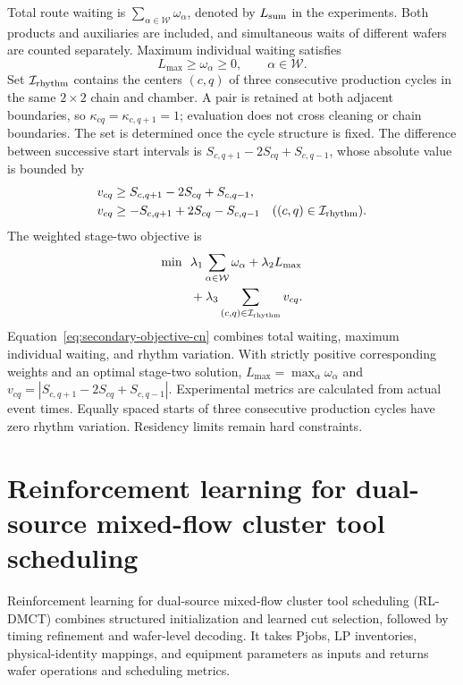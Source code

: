 \documentclass[final,5p,times,twocolumn]{elsarticle}
\newcounter{algorithm}
\begin{document}
Total route waiting is $\sum_{\alpha\in\mathcal W}\omega_\alpha$, denoted by $L_{\rm sum}$ in the experiments. Both products and auxiliaries are included, and simultaneous waits of different wafers are counted separately. Maximum individual waiting satisfies
\begin{equation}
L_{\max}\ge\omega_\alpha\ge0,\qquad \alpha\in\mathcal W.
\label{eq:secondary-wait-cn}
\end{equation}
Set $\mathcal I_{\rm rhythm}$ contains the centers $(c,q)$ of three consecutive production cycles in the same $2\times2$ chain and chamber. A pair is retained at both adjacent boundaries, so $\kappa_{cq}=\kappa_{c,q+1}=1$; evaluation does not cross cleaning or chain boundaries. The set is determined once the cycle structure is fixed. The difference between successive start intervals is $S_{c,q+1}-2S_{cq}+S_{c,q-1}$, whose absolute value is bounded by
\begin{equation}
\begin{aligned}
v_{cq}&\ge S_{c,q+1}-2S_{cq}+S_{c,q-1},\\
v_{cq}&\ge-S_{c,q+1}+2S_{cq}-S_{c,q-1}
\quad((c,q)\in\mathcal I_{\rm rhythm}).
\end{aligned}
\label{eq:secondary-rhythm-cn}
\end{equation}
The weighted stage-two objective is
\begin{equation}
\begin{aligned}
\min\ \ &\lambda_1\sum_{\alpha\in\mathcal W}\omega_\alpha+\lambda_2L_{\max}\\
&+\lambda_3\sum_{(c,q)\in\mathcal I_{\rm rhythm}}v_{cq}.
\end{aligned}
\label{eq:secondary-objective-cn}
\end{equation}
Equation~\eqref{eq:secondary-objective-cn} combines total waiting, maximum individual waiting, and rhythm variation. With strictly positive corresponding weights and an optimal stage-two solution, $L_{\max}=\max_\alpha\omega_\alpha$ and $v_{cq}=|S_{c,q+1}-2S_{cq}+S_{c,q-1}|$. Experimental metrics are calculated from actual event times. Equally spaced starts of three consecutive production cycles have zero rhythm variation. Residency limits remain hard constraints.

\section{Reinforcement learning for dual-source mixed-flow cluster tool scheduling}
\label{sec:algorithm-cn}
Reinforcement learning for dual-source mixed-flow cluster tool scheduling (RL-DMCT) combines structured initialization and learned cut selection, followed by timing refinement and wafer-level decoding. It takes Pjobs, LP inventories, physical-identity mappings, and equipment parameters as inputs and returns wafer operations and scheduling metrics.
\end{document}
